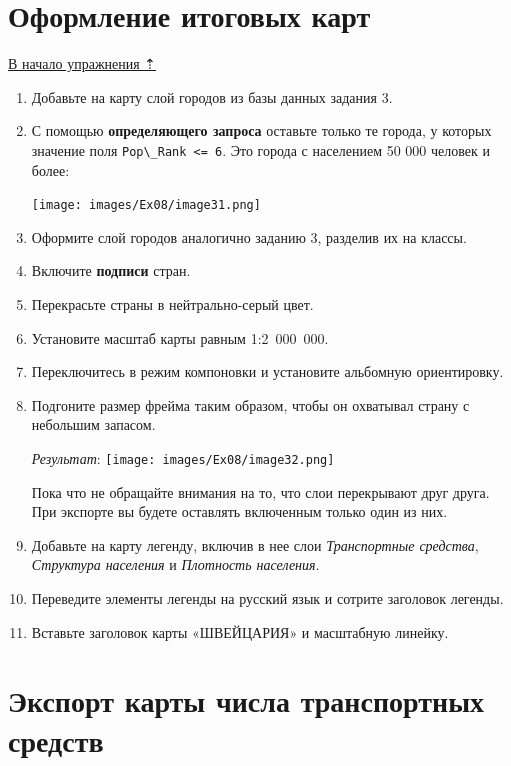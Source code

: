 \documentclass[12pt,]{book}
\begin{document}
\hypertarget{stat-map-economic-design}{%
\section{Оформление итоговых карт}\label{stat-map-economic-design}}

\protect\hyperlink{stat-map-economic}{В начало упражнения ⇡}

\begin{enumerate}
\def\labelenumi{\arabic{enumi}.}
\item
  Добавьте на карту слой городов из базы данных задания 3.
\item
  С помощью \textbf{определяющего запроса} оставьте только те города, у которых значение поля \texttt{Pop\textbackslash{}\_Rank\ \textless{}=\ 6}. Это города с населением 50 000 человек и более:

  \texttt{[image: images/Ex08/image31.png]}
\item
  Оформите слой городов аналогично заданию 3, разделив их на классы.
\item
  Включите \textbf{подписи} стран.
\item
  Перекрасьте страны в нейтрально-серый цвет.
\item
  Установите масштаб карты равным 1:2~000~000.
\item
  Переключитесь в режим компоновки и установите альбомную ориентировку.
\item
  Подгоните размер фрейма таким образом, чтобы он охватывал страну с небольшим запасом.

  \emph{Результат}:
  \texttt{[image: images/Ex08/image32.png]}

  Пока что не обращайте внимания на то, что слои перекрывают друг друга. При экспорте вы будете оставлять включенным только один из них.
\item
  Добавьте на карту легенду, включив в нее слои \emph{Транспортные средства}, \emph{Структура населения} и \emph{Плотность населения}.
\item
  Переведите элементы легенды на русский язык и сотрите заголовок легенды.
\item
  Вставьте заголовок карты «ШВЕЙЦАРИЯ» и масштабную линейку.
\end{enumerate}

\hypertarget{stat-map-economic-export-transport}{%
\section{Экспорт карты числа транспортных средств}\label{stat-map-economic-export-transport}}
\end{document}
